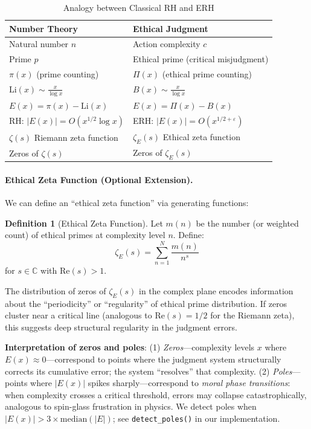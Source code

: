 \documentclass[12pt,a4paper]{article}
\theoremstyle{definition}
\newtheorem{definition}[theorem]{Definition}
\theoremstyle{remark}
\begin{document}
\begin{table}[h]
\centering
\caption{Analogy between Classical RH and ERH}
\label{tab:analogy}
\begin{tabular}{ll}
\toprule
\textbf{Number Theory} & \textbf{Ethical Judgment} \\
\midrule
Natural number $n$ & Action complexity $c$ \\
Prime $p$ & Ethical prime (critical misjudgment) \\
$\pi(x)$ (prime counting) & $\Pi(x)$ (ethical prime counting) \\
$\text{Li}(x) \sim \frac{x}{\log x}$ & $B(x) \sim \frac{x}{\log x}$ \\
$E(x) = \pi(x) - \text{Li}(x)$ & $E(x) = \Pi(x) - B(x)$ \\
RH: $|E(x)| = O(x^{1/2} \log x)$ & ERH: $|E(x)| = O(x^{1/2 + \varepsilon})$ \\
$\zeta(s)$ Riemann zeta function & $\zeta_E(s)$ Ethical zeta function \\
Zeros of $\zeta(s)$ & Zeros of $\zeta_E(s)$ \\
\bottomrule
\end{tabular}
\end{table}

\paragraph{Ethical Zeta Function (Optional Extension).}
We can define an ``ethical zeta function'' via generating functions:

\begin{definition}[Ethical Zeta Function]
Let $m(n)$ be the number (or weighted count) of ethical primes at complexity level $n$. Define:
\[
\zeta_E(s) = \sum_{n=1}^{N} \frac{m(n)}{n^s}
\]
for $s \in \mathbb{C}$ with $\text{Re}(s) > 1$.
\end{definition}

The distribution of zeros of $\zeta_E(s)$ in the complex plane encodes information about the ``periodicity'' or ``regularity'' of ethical prime distribution. If zeros cluster near a critical line (analogous to $\text{Re}(s) = 1/2$ for the Riemann zeta), this suggests deep structural regularity in the judgment errors.

\textbf{Interpretation of zeros and poles}: (1) \emph{Zeros}---complexity levels $x$ where $E(x) \approx 0$---correspond to points where the judgment system structurally corrects its cumulative error; the system ``resolves'' that complexity. (2) \emph{Poles}---points where $|E(x)|$ spikes sharply---correspond to \emph{moral phase transitions}: when complexity crosses a critical threshold, errors may collapse catastrophically, analogous to spin-glass frustration in physics. We detect poles when $|E(x)| > 3 \times \text{median}(|E|)$; see \texttt{detect\_poles()} in our implementation.
\end{document}
